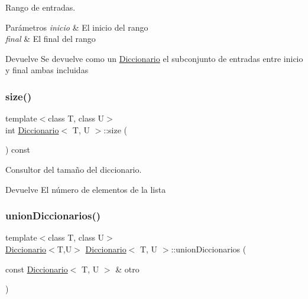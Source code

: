 Rango de entradas. 


\begin{DoxyParams}{Parámetros}
{\em inicio} & El inicio del rango \\
\hline
{\em final} & El final del rango \\
\hline
\end{DoxyParams}
\begin{DoxyReturn}{Devuelve}
Se devuelve como un \hyperlink{classDiccionario}{Diccionario} el subconjunto de entradas entre inicio y final ambas incluidas 
\end{DoxyReturn}
\mbox{\label{classDiccionario_aa576b001759429fd58210ca57257d6f8}} 
\subsubsection{\texorpdfstring{size()}{size()}}
{\footnotesize\ttfamily template$<$class T, class U$>$ \\
int \hyperlink{classDiccionario}{Diccionario}$<$ T, U $>$\+::size (\begin{DoxyParamCaption}{ }\end{DoxyParamCaption}) const\hspace{0.3cm}{\ttfamily [inline]}}



Consultor del tamaño del diccionario. 

\begin{DoxyReturn}{Devuelve}
El número de elementos de la lista 
\end{DoxyReturn}
\mbox{\label{classDiccionario_afa915dec9a281340b8de575026131e7f}} 
\subsubsection{\texorpdfstring{union\+Diccionarios()}{unionDiccionarios()}}
{\footnotesize\ttfamily template$<$class T, class U$>$ \\
\hyperlink{classDiccionario}{Diccionario}$<$T,U$>$ \hyperlink{classDiccionario}{Diccionario}$<$ T, U $>$\+::union\+Diccionarios (\begin{DoxyParamCaption}\item[{const \hyperlink{classDiccionario}{Diccionario}$<$ T, U $>$ \&}]{otro }\end{DoxyParamCaption})}



